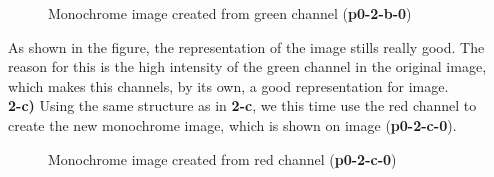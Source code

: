 \documentclass[12pt,a4paper]{article}
\begin{document}
\begin{figure}[!h]
	\centering
	{%
		\setlength{\fboxsep}{1pt}%
		\setlength{\fboxrule}{1pt}%
	}%
	\caption{Monochrome image created from green channel (\textbf{p0-2-b-0})}
	\label{fig:img-green}
\end{figure}

As shown in the figure, the representation of the image stills really good. The reason for this is the high intensity of the green channel in the original image, which makes this channels, by its own, a good representation for image.\\

\textbf{2-c) } Using the same structure as in \textbf{2-c}, we this time use the red channel to create the new monochrome image, which is shown on image (\textbf{p0-2-c-0}).

\begin{figure}[!h]
	\centering
	{%
		\setlength{\fboxsep}{1pt}%
		\setlength{\fboxrule}{1pt}%
	}%
	\caption{Monochrome image created from red channel (\textbf{p0-2-c-0})}
	\label{fig:img-red}
\end{figure}
\end{document}
